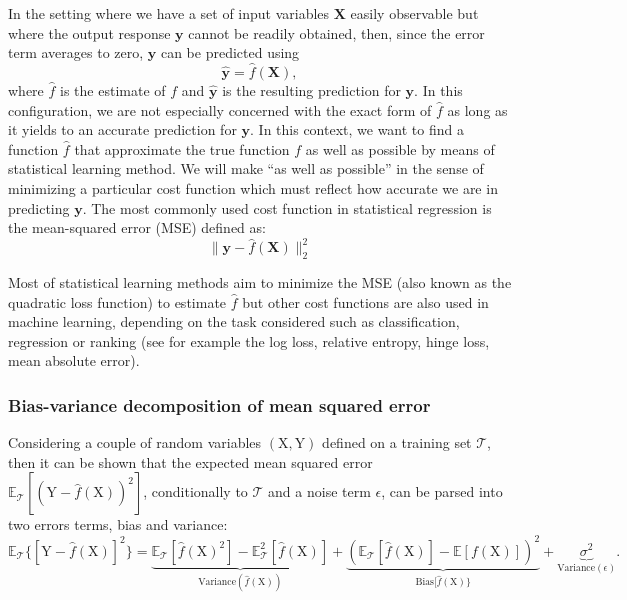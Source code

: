 \documentclass[]{book}
\begin{document}
In the setting where we have a set of input variables \(\mathbf{X}\) easily
observable but where the output response \(\mathbf{y}\) cannot be readily
obtained, then, since the error term averages to zero, \(\mathbf{y}\) can be
predicted using \[\hat{\mathbf{y}} = \hat{f}(\mathbf{X}),\] where \(\hat{f}\) is the
estimate of \(f\) and \(\hat{\mathbf{y}}\) is the resulting prediction for \(\mathbf{y}\).
In this configuration, we are not especially concerned with the exact
form of \(\hat{f}\) as long as it yields to an accurate prediction for
\(\mathbf{y}\). In this context, we want to find a function \(\hat{f}\) that
approximate the true function \(f\) as well as possible by means of
statistical learning method. We will make ``as well as possible'' in the
sense of minimizing a particular cost function which must reflect how
accurate we are in predicting \(\mathbf{y}\). The most commonly used cost
function in statistical regression is the mean-squared error (MSE)
defined as: \[\| \mathbf{y} - \hat{f}(\mathbf{X})\|_2^2\]

Most of statistical learning methods aim to minimize the MSE (also known
as the quadratic loss function) to estimate \(\hat{f}\) but other cost
functions are also used in machine learning, depending on the task
considered such as classification, regression or ranking (see for
example the log loss, relative entropy, hinge loss, mean absolute
error).

\hypertarget{bias-variance-decomposition-of-mean-squared-error}{%
\subsubsection*{Bias-variance decomposition of mean squared error}\label{bias-variance-decomposition-of-mean-squared-error}}

Considering a couple of random variables \((\mathrm{X}, \mathrm{Y})\) defined on a
training set \(\mathcal{T}\), then it can be shown that the expected mean
squared error \(\mathbb{E}_\mathcal{T}[(\mathrm{Y} - \hat{f}(\mathrm{X}))^2]\),
conditionally to \(\mathcal{T}\) and a noise term \(\epsilon\), can be
parsed into two errors terms, bias and variance:
\[\mathbb{E}_\mathcal{T}\lbrace[\mathrm{Y} - \hat{f}(\mathrm{X})]^2\rbrace = \underbrace{\mathbb{E}_\mathcal{T}[\hat{f}(\mathrm{X})^2] - \mathbb{E}^2_\mathcal{T}[\hat{f}(\mathrm{X})]}_{\text{Variance}(\hat{f}(\mathrm{X}))} + \underbrace{(\mathbb{E}_\mathcal{T}[\hat{f}(\mathrm{X})] - \mathbb{E}[f(\mathrm{X})])^2}_{\text{Bias}[\hat{f}(\mathrm{X})\rbrace} + \underbrace{\sigma^2}_{\text{Variance}(\epsilon)}.\]
\end{document}
